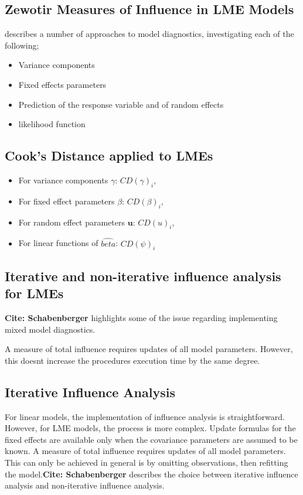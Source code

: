 \documentclass[12pt, a4paper]{article}
\theoremstyle{plain}
\theoremstyle{definition}
\theoremstyle{remark}
\begin{document}
\subsection{Zewotir Measures of Influence in LME Models}%
\citet{Zewotir} describes a number of approaches to model diagnostics, investigating each of the following;
\begin{itemize}
\item Variance components
\item Fixed effects parameters
\item Prediction of the response variable and of random effects
\item likelihood function
\end{itemize}

\subsection{Cook's Distance applied to LMEs}
\begin{itemize}
\item For variance components $\gamma$: $CD(\gamma)_i$,
\item For fixed effect parameters $\beta$: $CD(\beta)_i$,
\item For random effect parameters $\boldsymbol{u}$: $CD(u)_i$,
\item For linear functions of $\hat{beta}$: $CD(\psi)_i$
\end{itemize}

\subsection{Iterative and non-iterative influence analysis for LMEs} %

\textbf{Cite: Schabenberger} highlights some of the issue regarding implementing mixed model diagnostics.

A measure of total influence requires updates of all model parameters. However, this doesnt increase the procedures execution time by the same degree.

\subsection{Iterative Influence Analysis}

For linear models, the implementation of influence analysis is straightforward.
However, for LME models, the process is more complex. Update formulas for the fixed effects are available only when the covariance parameters are assumed to be known. A measure of total influence requires updates of all model parameters. This can only be achieved in general is by omitting observations, then refitting the model.\textbf{Cite: Schabenberger} describes the choice between  iterative influence analysis and  non-iterative influence analysis.
\end{document}
